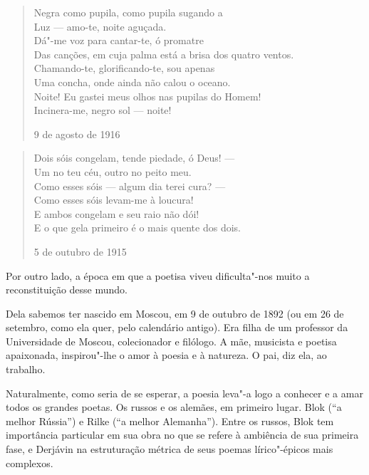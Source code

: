 \begin{verse}
Negra como pupila, como pupila sugando a \\
Luz --- amo-te, noite aguçada. \\[8pt]
Dá"-me voz para cantar-te, ó promatre \\
Das canções, em cuja palma está a brisa \qb{}dos quatro ventos. \\[8pt]
Chamando-te, glorificando-te, sou apenas \\
Uma concha, onde ainda não calou o oceano. \\[8pt]
Noite! Eu gastei meus olhos nas pupilas \qb{}do Homem! \\
Incinera-me, negro sol --- noite!

9 de agosto de 1916
\end{verse}

\pagebreak

\begin{verse}
Dois sóis congelam, tende piedade, \qb{}ó Deus! --- \\
Um no teu céu, outro no peito meu. \\[8pt]
Como esses sóis --- algum dia terei cura? --- \\
Como esses sóis levam-me à loucura! \\[8pt]
E ambos congelam e seu raio não dói! \\
E o que gela primeiro é o mais quente dos dois.

5 de outubro de 1915

\end{verse}

Por outro lado, a época em que a poetisa viveu dificulta"-nos muito a reconstituição desse mundo.

Dela sabemos ter nascido em Moscou, em 9 de outubro de 1892 (ou
em 26 de setembro, como ela quer, pelo calendário antigo). Era
filha de um professor da Universidade de Moscou, colecionador e
filólogo. A mãe, musicista e poetisa apaixonada, inspirou"-lhe o
amor à poesia e à natureza. O pai, diz ela, ao trabalho.

Naturalmente, como seria de se esperar, a poesia leva"-a logo a
conhecer e a amar todos os grandes poetas. Os russos e os alemães,
em primeiro lugar. Blok (``a melhor Rússia'') e Rilke (``a melhor
Alemanha''). Entre os russos, Blok tem importância particular em
sua obra no que se refere à ambiência de sua primeira fase, e
Derjávin na estruturação métrica de seus poemas lírico"-épicos
mais complexos.

